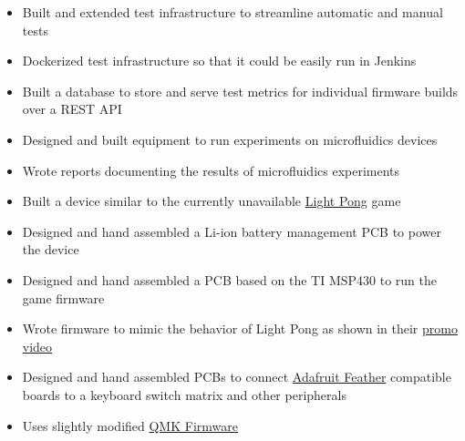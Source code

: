 \documentclass{resume}
\begin{document}
\begin{itemize}
    \item Built and extended test infrastructure to streamline automatic and manual tests
    \item Dockerized test infrastructure so that it could be easily run in Jenkins
    \item Built a database to store and serve test metrics for individual firmware builds over a REST API
\end{itemize}

\begin{itemize}
    \item Designed and built equipment to run experiments on microfluidics devices
    \item Wrote reports documenting the results of microfluidics experiments
\end{itemize}

\TechnicalProjects

\begin{itemize}
    \item Built a device similar to the currently unavailable \href{https://www.playlightpong.com/}{Light Pong} game
    \item Designed and hand assembled a Li-ion battery management PCB to power the device
    \item Designed and hand assembled a PCB based on the TI MSP430 to run the game firmware
    \item Wrote firmware to mimic the behavior of Light Pong as shown in their \href{https://player.vimeo.com/video/616594964}{promo video}
\end{itemize}

\begin{itemize}
    \item Designed and hand assembled PCBs to connect \href{https://learn.adafruit.com/adafruit-feather}{Adafruit Feather} compatible boards to a keyboard switch matrix and other peripherals
    \item Uses slightly modified \href{https://github.com/Gigahawk/qmk_firmware/tree/quartet}{QMK Firmware}
\end{itemize}
\end{document}
